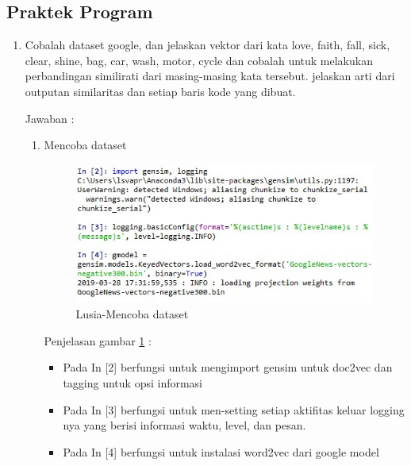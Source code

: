 \subsection{Praktek Program}
\begin{enumerate}
\item Cobalah dataset google, dan jelaskan vektor dari kata love, faith, fall, sick, clear, shine, bag, car, wash, motor, cycle dan cobalah untuk melakukan perbandingan similirati dari masing-masing kata tersebut. jelaskan arti dari outputan similaritas dan setiap baris kode yang dibuat.
	\par Jawaban :
	\begin{enumerate}
		\item Mencoba dataset
		
			\begin{figure}[!hbtp]
			\centering
			\includegraphics[scale=0.4]{figures/chap5.jpg}
			\caption{Lusia-Mencoba dataset}
			\label{5b1}
			\end{figure}
			
			\par Penjelasan gambar \ref{5b1} :
			\begin{itemize}
				\item Pada In [2] berfungsi untuk mengimport gensim untuk doc2vec dan tagging untuk opsi informasi
				\item Pada In [3] berfungsi  untuk men-setting setiap aktifitas keluar logging nya yang berisi informasi waktu, level, dan pesan.
				\item Pada In [4] berfungsi  untuk instalasi word2vec dari google model 
			\end{itemize}
			

\end{enumerate}
\end{enumerate}
